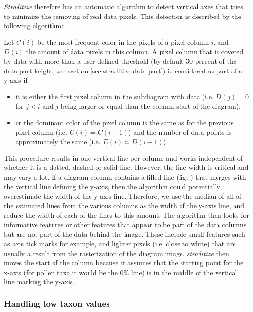 \documentclass[
11pt, %
english, %
singlespacing, %
headsepline, %
]{MastersDoctoralThesis} %
\begin{document}
\begin{NoHyper}
\begin{refsection}
\emph{Straditize} therefore has an automatic algorithm to detect vertical axes that tries to minimize the removing of real data pixels. This detection is described by the following algorithm:

Let $C(i)$ be the most frequent color in the pixels of a pixel column $i$, and $D(i)$ the amount of data pixels in this column. A pixel column that is covered by data with more than a user-defined threshold (by default 30 percent of the data part height, see section \ref{sec:straditize-data-part}) is considered as part of a y-axis if 
\begin{itemize}
	\item it is either the first pixel column in the subdiagram with data (i.e. $D(j) = 0$ for $j < i$ and $j$ being larger or equal than the column start of the diagram),
	\item or the dominant color of the pixel column is the same as for the previous pixel column (i.e. $C(i) = C(i-1)$) and the number of data points is approximately the same (i.e. $D(i) \approx  D(i-1)$).
\end{itemize}

This procedure results in one vertical line per column and works independent of whether it is a dotted, dashed or solid line. However, the line width is critical and may vary a lot. If a diagram column contains a filled line (fig. \samplediagram[h]) that merges with the vertical line defining the y-axis, then the algorithm could potentially overestimate the width of the y-axis line. Therefore, we use the median of all of the estimated lines from the various columns as the width of the y-axis line, and reduce the width of each of the lines to this amount.
The algorithm then looks for informative features or other features that appear to be part of the data columns but are not part of the data behind the image. These include small features such as axis tick marks for example, and lighter pixels (i.e. close to white) that are usually a result from the rasterization of the diagram image.
\emph{straditize} then moves the start of the column because it assumes that the starting point for the x-axis (for pollen taxa it would be the 0\% line) is in the middle of the vertical line marking the y-axis.


\subsubsection{Handling low taxon values}  \label{sec:straditize-occurences}


\end{refsection}
\end{NoHyper}
\end{document}
